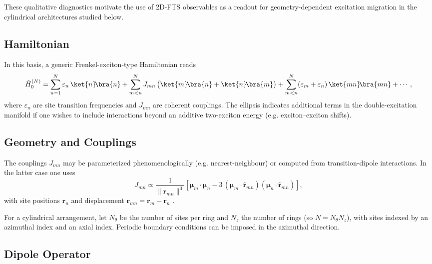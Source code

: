 These qualitative diagnostics motivate the use of 2D-FTS observables as a readout for geometry-dependent excitation migration in the cylindrical architectures studied below.

\subsection{Hamiltonian}


In this basis, a generic Frenkel-exciton-type Hamiltonian reads
\begin{equation*}
	\hat{H}_{0}^{(N)}
	= \sum_{n=1}^{N} \varepsilon_n\,\ket{n}\!\bra{n}
	+ \sum_{m<n}^{N} J_{mn}\,\big(\ket{m}\!\bra{n}+\ket{n}\!\bra{m}\big)
	+ \sum_{m<n}^{N} (\varepsilon_m+\varepsilon_n)\,\ket{mn}\!\bra{mn}
	+ \cdots,
\end{equation*}
where $\varepsilon_n$ are site transition frequencies and $J_{mn}$ are coherent couplings.
The ellipsis indicates additional terms in the double-excitation manifold if one wishes to include interactions beyond an additive two-exciton energy (e.g. exciton--exciton shifts).

\subsection{Geometry and Couplings}


The couplings $J_{mn}$ may be parameterized phenomenologically (e.g. nearest-neighbour) or computed from transition-dipole interactions. In the latter case one uses
\begin{equation*}
	J_{mn} \propto \frac{1}{ \lVert \boldsymbol{r}_{mn} \rVert^{3} }
	\left[
		\boldsymbol{\mu}_m \cdot \boldsymbol{\mu}_n
		- 3\,(\boldsymbol{\mu}_m \cdot \hat{\boldsymbol{r}}_{mn})(\boldsymbol{\mu}_n \cdot \hat{\boldsymbol{r}}_{mn})
		\right],
\end{equation*}
with site positions $\boldsymbol{r}_n$ and displacement $\boldsymbol{r}_{mn}=\boldsymbol{r}_m-\boldsymbol{r}_n$ \cite{griffiths2013introductionelectrodynamics,lehmberg1970radiationatomsystem,masters2014pathsforstersresonance}.


For a cylindrical arrangement, let $N_{\theta}$ be the number of sites per ring and $N_z$ the number of rings (so $N=N_{\theta}N_z$), with sites indexed by an azimuthal index and an axial index. Periodic boundary conditions can be imposed in the azimuthal direction.

\subsection{Dipole Operator}


